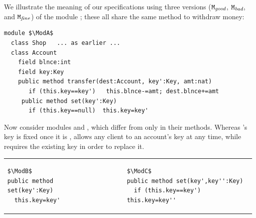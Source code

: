 {{%

\begin{example}
We illustrate the meaning of our specifications using three versions 
($\mbox{\normalfont{\texttt{M}}}_{{\textit{good}}}$,  $\mbox{\normalfont{\texttt{M}}}_{{\textit{bad}}}$, and $\mbox{\normalfont{\texttt{M}}}_{{\textit{fine}}}$) of the \Mshop module \cite{OOPSLA22};
these all share the same  method to withdraw money: 

\begin{lstlisting}[mathescape=true, language=Chainmail, frame=lines]
module $\ModA$      
  class Shop   ... as earlier ...
  class Account
    field blnce:int 
    field key:Key
    public method transfer(dest:Account, key':Key, amt:nat)
       if (this.key==key')   this.blnce-=amt; dest.blnce+=amt
     public method set(key':Key)
       if (this.key==null)  this.key=key'
\end{lstlisting}

\noindent Now consider modules \ModB and \ModC, which differ from \ModA
only in their  methods. Whereas \ModA 's key is fixed once it is ,
\ModB allows any client to  an account's key at any time, while
\ModC requires the existing key in order to replace it.

\vspace*{2mm}

\begin{tabular}{lll}
\begin{minipage}[b]{0.40\textwidth}

\begin{lstlisting}[mathescape=true, language=Chainmail, frame=lines]
$\ModB$
public method set(key':Key)
  this.key=key'
\end{lstlisting}
\end{minipage}
&\ \ \  \ \   &%
\begin{minipage}[b]{0.48\textwidth}
\begin{lstlisting}[mathescape=true, language=chainmail, frame=lines]
$\ModC$
public method set(key',key'':Key)
  if (this.key==key')  this.key=key''
\end{lstlisting}
\end{minipage} 
\end{tabular}


\end{example}}}
